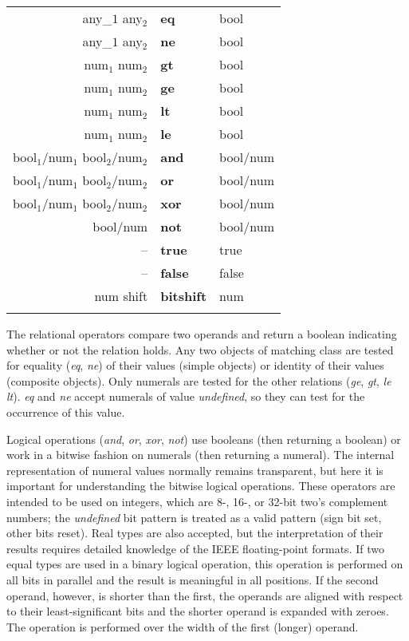 \begin{tabular}{>{\sffamily}r>{\sffamily\bfseries}l>{\sffamily}l}
any_$1$ any$_2$ & eq & bool\\
any_$1$ any$_2$ & ne & bool\\
num$_1$ num$_2$ & gt & bool\\
num$_1$ num$_2$ & ge & bool\\
num$_1$ num$_2$ & lt & bool\\
num$_1$ num$_2$ & le & bool\\
bool$_1$/num$_1$ bool$_2$/num$_2$ & and & bool/num\\
bool$_1$/num$_1$ bool$_2$/num$_2$ & or & bool/num\\
bool$_1$/num$_1$ bool$_2$/num$_2$ & xor & bool/num\\
bool/num & not & bool/num\\
-- & true & true\\
-- & false & false\\
num shift & bitshift & num\\\\
\end{tabular}

The  relational  operators  compare two operands  and  return  a  boolean indicating whether or not the relation holds.  Any two objects of matching class are tested for equality (\emph{eq}, \emph{ne}) of their values (simple objects) or identity of their values (composite objects). Only numerals are tested for the other relations (\emph{ge},  \emph{gt}, \emph{le} \emph{lt}). \emph{eq} and \emph{ne} accept numerals of value \emph{undefined}, so they can test for the occurrence of this value.

Logical operations (\emph{and}, \emph{or}, \emph{xor},  \emph{not}) use booleans (then returning  a boolean) or work in a bitwise fashion on numerals (then returning a numeral). The internal representation of numeral values normally remains transparent, but here it is important for understanding the bitwise logical operations. These operators are intended to be used on integers, which are 8-, 16-, or 32-bit two's complement numbers; the \emph{undefined} bit pattern is treated as a valid pattern (sign bit set, other bits reset). Real types are also accepted, but the interpretation of their results requires detailed knowledge of the IEEE floating-point formats. If two equal types are used in a binary logical operation, this operation is performed on all bits in parallel and the result is meaningful in all positions. If the second operand, however, is shorter than the first, the operands are aligned with respect to their least-significant bits and the shorter operand is expanded with zeroes. The operation is performed over the width of the first (longer) operand.

